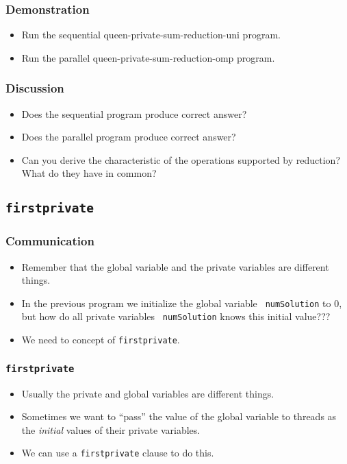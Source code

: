 \documentclass{beamer}
\begin{document}
\begin{frame}
\frametitle{Demonstration}
\begin{itemize}
\item Run the sequential queen-private-sum-reduction-uni program.
\item Run the parallel queen-private-sum-reduction-omp program.
\end{itemize}
\end{frame}

\begin{frame}
\frametitle{Discussion}
\begin{itemize}
\item Does the sequential program produce correct answer?
\item Does the parallel program produce correct answer?
\item Can you derive the characteristic of the operations supported by
  reduction?  What do they have in common?
\end{itemize}
\end{frame}


\subsection{\tt firstprivate}

\begin{frame}
\frametitle{Communication}
\begin{itemize}
\item Remember that the global variable and the private variables are
  different things.
\item In the previous program we initialize the global variable {\tt
  numSolution} to 0, but how do all private variables {\tt
  numSolution} knows this initial value???
\item We need to concept of {\tt firstprivate}.
\end{itemize}
\end{frame}

\begin{frame}
\frametitle{\tt firstprivate}
\begin{itemize}
\item Usually the private and global variables are different things.
\item Sometimes we want to ``pass'' the value of the global variable
  to threads as the {\em initial} values of their private variables.
\item We can use a {\tt firstprivate} clause to do this.
\end{itemize}
\end{frame}
\end{document}
